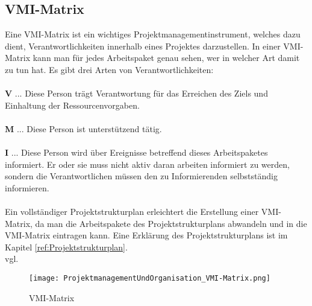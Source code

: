 \subsection{VMI-Matrix}
\label{sec:VMI-Matrix}
Eine VMI-Matrix ist ein wichtiges Projektmanagementinstrument, welches dazu dient, Verantwortlichkeiten innerhalb eines Projektes darzustellen. In einer VMI-Matrix kann man für jedes Arbeitspaket genau sehen, wer in welcher Art damit zu tun hat. Es gibt drei Arten von Verantwortlichkeiten: \\ \\
\textbf{V} ... Diese Person trägt Verantwortung für das Erreichen des Ziels und Einhaltung der Ressourcenvorgaben.\\ \\
\textbf{M} ... Diese Person ist unterstützend tätig.\\ \\
\textbf{I} ... Diese Person wird über Ereignisse betreffend dieses Arbeitspaketes informiert. Er oder sie muss nicht aktiv daran arbeiten informiert zu werden, sondern die Verantwortlichen müssen den zu Informierenden selbstständig informieren.\\ \\
Ein vollständiger Projektstrukturplan erleichtert die Erstellung einer VMI-Matrix, da man die Arbeitspakete des Projektstrukturplans abwandeln und in die VMI-Matrix eintragen kann. Eine Erklärung des Projektstrukturplans ist im Kapitel \ref{ref:Projektstrukturplan}.\\vgl. 
\textcite{VMI-Matrix}\\

\begin{figure}[H]
	\texttt{[image: ProjektmanagementUndOrganisation\_VMI-Matrix.png]}
    \caption{VMI-Matrix}
    \label{fig:vmi-Matrix}
\end{figure}


\pagebreak	
		
